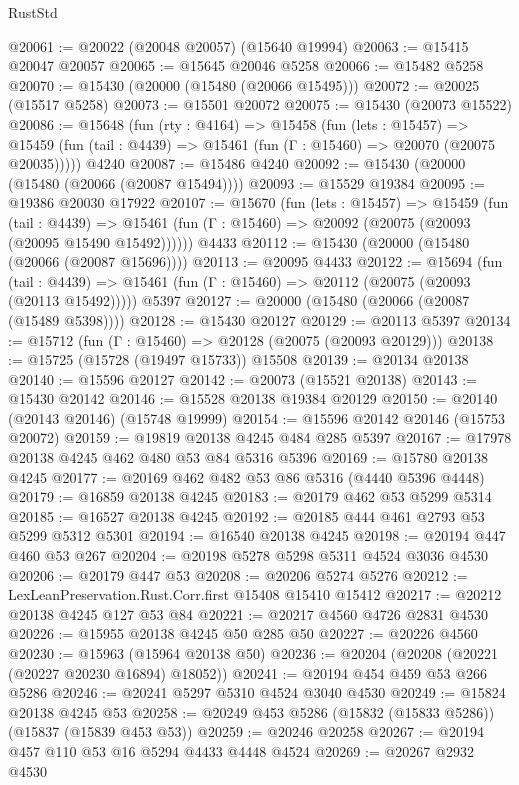 \begin{lexlean}{RustStd}
\begin{coremodule}
@20061 := @20022 (@20048 @20057) (@15640 @19994)
@20063 := @15415 @20047 @20057
@20065 := @15645 @20046 @5258
@20066 := @15482 @5258
@20070 := @15430 (@20000 (@15480 (@20066 @15495)))
@20072 := @20025 (@15517 @5258)
@20073 := @15501 @20072
@20075 := @15430 (@20073 @15522)
@20086 := @15648
    (fun (rty : @4164) =>
    @15458
      (fun (lets : @15457) =>
      @15459 (fun (tail : @4439) => @15461 (fun (Γ : @15460) => @20070 (@20075 @20035)))))
    @4240
@20087 := @15486 @4240
@20092 := @15430 (@20000 (@15480 (@20066 (@20087 @15494))))
@20093 := @15529 @19384
@20095 := @19386 @20030 @17922
@20107 := @15670
    (fun (lets : @15457) =>
    @15459
      (fun (tail : @4439) =>
      @15461 (fun (Γ : @15460) => @20092 (@20075 (@20093 (@20095 @15490 @15492))))))
    @4433
@20112 := @15430 (@20000 (@15480 (@20066 (@20087 @15696))))
@20113 := @20095 @4433
@20122 := @15694
    (fun (tail : @4439) => @15461 (fun (Γ : @15460) => @20112 (@20075 (@20093 (@20113 @15492)))))
    @5397
@20127 := @20000 (@15480 (@20066 (@20087 (@15489 @5398))))
@20128 := @15430 @20127
@20129 := @20113 @5397
@20134 := @15712 (fun (Γ : @15460) => @20128 (@20075 (@20093 @20129)))
@20138 := @15725 (@15728 (@19497 @15733)) @15508
@20139 := @20134 @20138
@20140 := @15596 @20127
@20142 := @20073 (@15521 @20138)
@20143 := @15430 @20142
@20146 := @15528 @20138 @19384 @20129
@20150 := @20140 (@20143 @20146) (@15748 @19999)
@20154 := @15596 @20142 @20146 (@15753 @20072)
@20159 := @19819 @20138 @4245 @484 @285 @5397
@20167 := @17978 @20138 @4245 @462 @480 @53 @84 @5316 @5396
@20169 := @15780 @20138 @4245
@20177 := @20169 @462 @482 @53 @86 @5316 (@4440 @5396 @4448)
@20179 := @16859 @20138 @4245
@20183 := @20179 @462 @53 @5299 @5314
@20185 := @16527 @20138 @4245
@20192 := @20185 @444 @461 @2793 @53 @5299 @5312 @5301
@20194 := @16540 @20138 @4245
@20198 := @20194 @447 @460 @53 @267
@20204 := @20198 @5278 @5298 @5311 @4524 @3036 @4530
@20206 := @20179 @447 @53
@20208 := @20206 @5274 @5276
@20212 := LexLeanPreservation.Rust.Corr.first @15408 @15410 @15412
@20217 := @20212 @20138 @4245 @127 @53 @84
@20221 := @20217 @4560 @4726 @2831 @4530
@20226 := @15955 @20138 @4245 @50 @285 @50
@20227 := @20226 @4560
@20230 := @15963 (@15964 @20138 @50)
@20236 := @20204 (@20208 (@20221 (@20227 @20230 @16894) @18052))
@20241 := @20194 @454 @459 @53 @266 @5286
@20246 := @20241 @5297 @5310 @4524 @3040 @4530
@20249 := @15824 @20138 @4245 @53
@20258 := @20249 @453 @5286 (@15832 (@15833 @5286)) (@15837 (@15839 @453 @53))
@20259 := @20246 @20258
@20267 := @20194 @457 @110 @53 @16 @5294 @4433 @4448 @4524
@20269 := @20267 @2932 @4530

\end{coremodule}
\end{lexlean}
